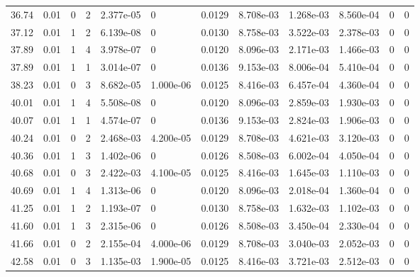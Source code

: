\documentclass[preview]{standalone}
\begin{document}
{{{\begin{tabular}{L{1.2cm}C{1.2cm} C{0.3cm}C{0.5cm} C{1.4cm}C{1.4cm} C{1.4cm}C{1.4cm} C{1.6cm}C{1.6cm} C{1.6cm}C{1.6cm}}
  36.74  &  0.01  & 0     &  2 &  2.377e-05  & 0  &  0.0129&   8.708e-03& 1.268e-03 & 8.560e-04   &  0 & 0  \\ 
  37.12  &  0.01  & 1     &  2 &  6.139e-08  & 0  &  0.0130&   8.758e-03& 3.522e-03 & 2.378e-03   &  0 & 0  \\ 
  37.89  &  0.01  & 1     &  4 &  3.978e-07  & 0  &  0.0120&   8.096e-03& 2.171e-03 & 1.466e-03   &  0 & 0  \\ 
  37.89  &  0.01  & 1     &  1 &  3.014e-07  & 0  &  0.0136&   9.153e-03& 8.006e-04 & 5.410e-04   &  0 & 0  \\ 
  38.23  &  0.01  & 0     &  3 &  8.682e-05  & 1.000e-06  &  0.0125&   8.416e-03& 6.457e-04 & 4.360e-04   &  0 & 0  \\ 
  40.01  &  0.01  & 1     &  4 &  5.508e-08  & 0  &  0.0120&   8.096e-03& 2.859e-03 & 1.930e-03   &  0 & 0  \\ 
  40.07  &  0.01  & 1     &  1 &  4.574e-07  & 0  &  0.0136&   9.153e-03& 2.824e-03 & 1.906e-03   &  0 & 0  \\ 
  40.24  &  0.01  & 0     &  2 &  2.468e-03  & 4.200e-05  &  0.0129&   8.708e-03& 4.621e-03 & 3.120e-03   &  0 & 0  \\ 
  40.36  &  0.01  & 1     &  3 &  1.402e-06  & 0  &  0.0126&   8.508e-03& 6.002e-04 & 4.050e-04   &  0 & 0  \\ 
  40.68  &  0.01  & 0     &  3 &  2.422e-03  & 4.100e-05  &  0.0125&   8.416e-03& 1.645e-03 & 1.110e-03   &  0 & 0  \\ 
  40.69  &  0.01  & 1     &  4 &  1.313e-06  & 0  &  0.0120&   8.096e-03& 2.018e-04 & 1.360e-04   &  0 & 0  \\ 
  41.25  &  0.01  & 1     &  2 &  1.193e-07  & 0  &  0.0130&   8.758e-03& 1.632e-03 & 1.102e-03   &  0 & 0  \\ 
  41.60  &  0.01  & 1     &  3 &  2.315e-06  & 0  &  0.0126&   8.508e-03& 3.450e-04 & 2.330e-04   &  0 & 0  \\ 
  41.66  &  0.01  & 0     &  2 &  2.155e-04  & 4.000e-06  &  0.0129&   8.708e-03& 3.040e-03 & 2.052e-03   &  0 & 0  \\ 
  42.58  &  0.01  & 0     &  3 &  1.135e-03  & 1.900e-05  &  0.0125&   8.416e-03& 3.721e-03 & 2.512e-03   &  0 & 0  \\ 
\hline 
\end{tabular} 

}}}
\end{document}
